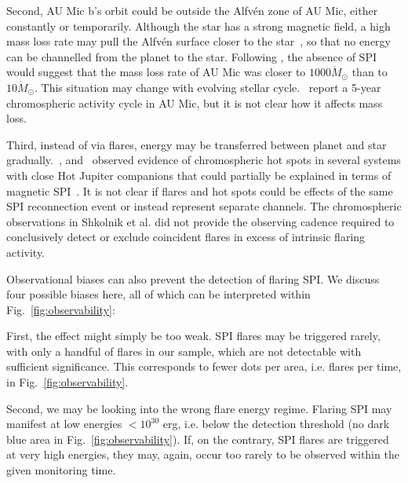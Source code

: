 \documentclass[fleqn,usenatbib]{mnras}%
\begin{document}
Second, AU Mic b's orbit could be outside the Alfv\'en zone of AU Mic, either constantly or temporarily. Although the star has a strong magnetic field, a high mass loss rate may pull the Alfv\'en surface closer to the star~\citep{kavanagh2021}, so that no energy can be channelled from the planet to the star. Following \citet{kavanagh2021}, the absence of SPI would suggest that the mass loss rate of AU Mic was closer to $1000\dot{M}_\odot$ than to $10\dot{M}_\odot$. This situation may change with evolving stellar cycle.~\citet{ibanezbustos2019first} report a 5-year chromospheric activity cycle in AU Mic, but it is not clear how it affects mass loss.

Third, instead of via flares, energy may be transferred between planet and star gradually.~\citet{shkolnik2003evidence, shkolnik2005hot}, and~\citet{shkolnik2008nature} observed evidence of chromospheric hot spots in several systems with close Hot Jupiter companions that could partially be explained in terms of magnetic SPI~\citep{cohen2011dynamics,lanza2012starplanet}. It is not clear if flares and hot spots could be effects of the same SPI reconnection event or instead represent separate channels. The chromospheric observations in Shkolnik et al. did not provide the observing cadence required to conclusively detect or exclude coincident flares in excess of intrinsic flaring activity.

Observational biases can also prevent the detection of flaring SPI. We discuss four possible biases here, all of which can be interpreted within Fig.~\ref{fig:observability}:

First, the effect might simply be too weak. SPI flares may be triggered rarely, with only a handful of flares in our sample, which are not detectable with sufficient significance. This corresponds to fewer dots per area, i.e. flares per time, in Fig.~\ref{fig:observability}.

Second, we may be looking into the wrong flare energy regime. Flaring SPI may manifest at low energies $<10^{30}$ erg, i.e. below the detection threshold (no dark blue area in Fig.~\ref{fig:observability}). If, on the contrary, SPI flares are triggered at very high energies, they may, again, occur too rarely to be observed within the given monitoring time. 
\end{document}
